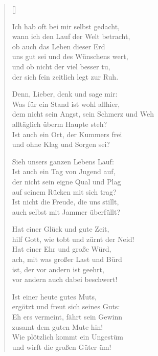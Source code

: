 \begin{multicols}{2}
\settowidth{\versewidth}{dem nicht sein Angst, sein Schmerz und Weh}
\begin{verse}[\versewidth]

 Ich hab oft bei mir selbst gedacht,\\
wann ich den Lauf der Welt betracht,\\
ob auch das Leben dieser Erd\\
uns gut sei und des Wünschens wert,\\
und ob nicht der viel besser tu,\\
der sich fein zeitlich legt zur Ruh.

 Denn, Lieber, denk und sage mir:\\
Was für ein Stand ist wohl allhier,\\
dem nicht sein Angst, sein Schmerz und Weh\\
alltäglich überm Haupte steh?\\
Ist auch ein Ort, der Kummers frei\\
und ohne Klag und Sorgen sei?

 Sieh unsers ganzen Lebens Lauf:\\
Ist auch ein Tag von Jugend auf,\\
der nicht sein eigne Qual und Plag\\
auf seinem Rücken mit sich trag?\\
Ist nicht die Freude, die uns stillt,\\
auch selbst mit Jammer überfüllt?

 Hat einer Glück und gute Zeit,\\
hilf Gott, wie tobt und zürnt der Neid!\\
Hat einer Ehr und große Würd,\\
ach, mit was großer Last und Bürd\\
ist, der vor andern ist geehrt,\\
vor andern auch dabei beschwert!

 Ist einer heute gutes Muts,\\
ergötzt und freut sich seines Guts:\\
Eh ers vermeint, fährt sein Gewinn\\
zusamt dem guten Mute hin!\\
Wie plötzlich kommt ein Ungestüm\\
und wirft die großen Güter üm!


\end{verse}
\end{multicols}
